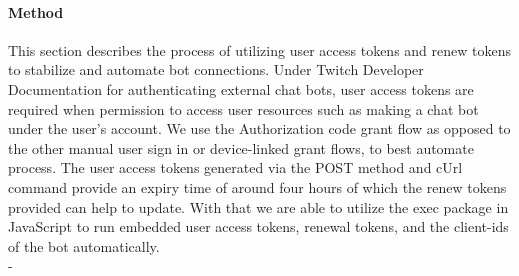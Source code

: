 \begin{enumerate}
\paragraph{\textbf{Method}}
This section describes the process of utilizing user access tokens and renew tokens to stabilize and automate bot connections. Under Twitch Developer Documentation for authenticating external chat bots, user access tokens are required when permission to access user resources such as making a chat bot under the user's account. We use the Authorization code grant flow as opposed to the other manual user sign in or device-linked grant flows, to best automate process. The user access tokens generated via the POST method and cUrl command provide an expiry time of around four hours of which the renew tokens provided can help to update. With that we are able to utilize the exec package in JavaScript to run embedded user access tokens, renewal tokens, and the client-ids of the bot automatically.\\
{\color{white}-} 
\end{enumerate}